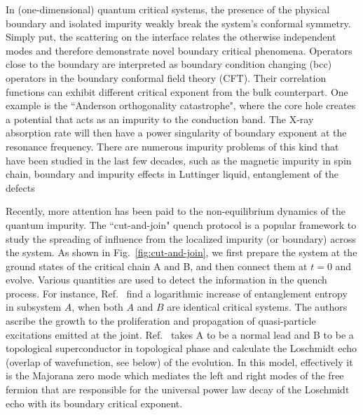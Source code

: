

In (one-dimensional) quantum critical systems, the presence of the physical boundary and isolated impurity weakly break the system's conformal symmetry. Simply put, the scattering on the interface relates the otherwise independent modes and therefore demonstrate novel boundary critical phenomena\cite{cardy_boundary_2004}. Operators close to the boundary are interpreted as boundary condition changing (bcc) operators\cite{oshikawa_boundary_1997,affleck_boundary_1997} in the boundary conformal field theory (CFT). Their correlation functions can exhibit different critical exponent from the bulk counterpart\cite{cardy_conformal_1984}. One example is the ``Anderson orthogonality catastrophe", where the core hole creates a potential that acts as an impurity to the conduction band. The X-ray absorption rate will then have a power singularity of boundary exponent\cite{affleck_boundary_1997} at the resonance frequency. There are numerous impurity problems of this kind that have been studied in the last few decades, such as the magnetic impurity in spin chain\cite{eggert_magnetic_1992}, boundary and impurity effects in Luttinger liquid\cite{fabrizio_interacting_1995}, entanglement of the defects\cite{peschel_entanglement_2005, igloi_entanglement_2009,calabrese_entanglement_2012} \etc

Recently, more attention has been paid to the non-equilibrium dynamics of the quantum impurity. \cite{hegde_quench_2015,francica_local_2016,lupo_transient_2016,lee_spatiotemporal_2016,chung_memory_2016,kibble-zurek_2017,sacramento_edge_2016,vasseur_expansion_2015,mazza_overlap_2016}The ``cut-and-join" quench protocol is a popular framework to study the spreading of influence from the localized impurity (or boundary) across the system. As shown in Fig.~\ref{fig:cut-and-join}, we first prepare the system at the ground states of the critical chain A and B, and then connect them at $t = 0$ and evolve. Various quantities are used to detect the information in the quench process. For instance, Ref.~ find a logarithmic increase of entanglement entropy in subsystem $A$, when both $A$ and $B$ are identical critical systems. The authors ascribe the growth to the proliferation and propagation of quasi-particle excitations emitted at the joint. Ref.~ takes A to be a normal lead and B to be a topological superconductor in topological phase and calculate the Loschmidt echo (overlap of wavefunction, see below) of the evolution. In this model, effectively it is the Majorana zero mode which mediates the left and right modes of the free fermion that are responsible for the universal power law decay of the Loschmidt echo with its boundary critical exponent. 


